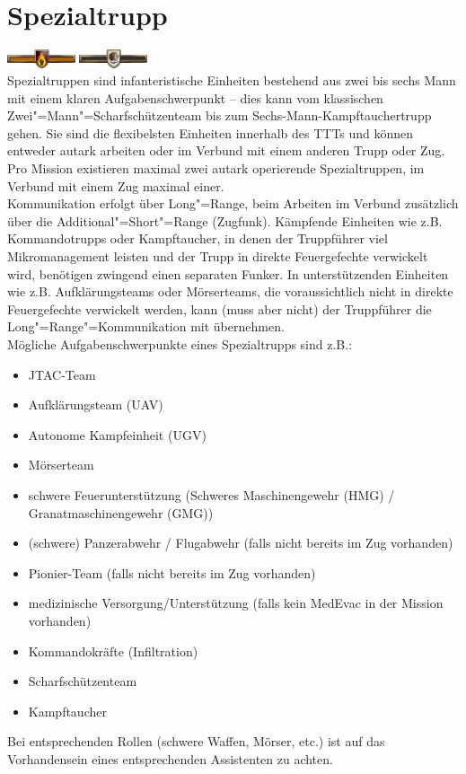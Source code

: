 \section{Spezialtrupp}
\includegraphics[width=20mm]{./img/truppenordnung/spezialeinheiten/sf1}\quad
\includegraphics[width=20mm]{./img/truppenordnung/spezialeinheiten/sf2}\\
Spezialtruppen sind infanteristische Einheiten bestehend aus zwei bis sechs Mann mit einem klaren Aufgabenschwerpunkt -- dies kann vom klassischen Zwei"=Mann"=Scharfschützenteam bis zum Sechs-Mann-Kampftauchertrupp gehen. Sie sind die flexibelsten Einheiten innerhalb des TTTs und können entweder autark arbeiten oder im Verbund mit einem anderen Trupp oder Zug. Pro Mission existieren maximal zwei autark operierende Spezialtruppen, im Verbund mit einem Zug maximal einer.\\
Kommunikation erfolgt über Long"=Range, beim Arbeiten im Verbund zusätzlich über die Additional"=Short"=Range (Zugfunk). Kämpfende Einheiten wie z.B. Kommandotrupps oder Kampftaucher, in denen der Truppführer viel Mikromanagement leisten und der Trupp in direkte Feuergefechte verwickelt wird, benötigen zwingend einen separaten Funker. In unterstützenden Einheiten wie z.B. Aufklärungsteams oder Mörserteams, die voraussichtlich nicht in direkte Feuergefechte verwickelt werden, kann (muss aber nicht) der Truppführer die Long"=Range"=Kommunikation mit übernehmen.\\
Mögliche Aufgabenschwerpunkte eines Spezialtrupps sind z.B.:

\begin{itemize}
	\setlength\itemsep{0em}
	\item JTAC-Team
	\item Aufklärungsteam (UAV)
	\item Autonome Kampfeinheit (UGV)
	\item Mörserteam
	\item schwere Feuerunterstützung (Schweres Maschinengewehr (HMG) / Granatmaschinengewehr (GMG))
	\item (schwere) Panzerabwehr / Flugabwehr (falls nicht bereits im Zug vorhanden)
	\item Pionier-Team (falls nicht bereits im Zug vorhanden)
	\item medizinische Versorgung/Unterstützung (falls kein MedEvac in der Mission vorhanden)
	\item Kommandokräfte (Infiltration)
	\item Scharfschützenteam
	\item Kampftaucher
\end{itemize}
Bei entsprechenden Rollen (schwere Waffen, Mörser, etc.) ist auf das Vorhandensein eines entsprechenden Assistenten zu achten.
